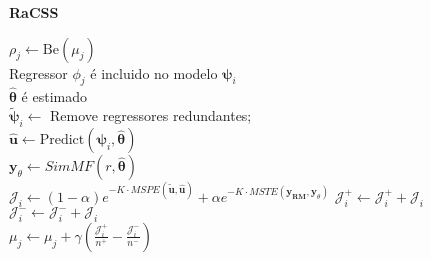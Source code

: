 \documentclass[12pt,a4paper,titlepage,final]{book}
\theoremstyle{definition}
\begin{document}
\begin{algorithm}[htpb]
  \caption{\bf{RaCSS}}\label{alg:RaMSS}
  {
     {
        {
           $\rho_j \gets \text{Be}(\mu_j)$ \\
           {
              Regressor $\phi_j$ é incluido no modelo $\bm{\psi}_i$\\
           }
        }
        $\hat{\bm{\theta}}$ é estimado \\
        $\tilde{\bm{\psi}}_i \gets $ Remove regressores redundantes; \\
        $\hat{\bm{u}} \gets \text{Predict}(\bm{\psi}_i,\hat{\bm{\theta}})$ \\
        $\bm{y}_{\theta} \gets SimMF(r,\hat{\bm{\theta}})$ \\
        $\mathcal{J}_i \gets (1-\alpha)e^{-K\cdot MSPE(\tilde{\bm{u}},\bm{\hat{u}})} + \alpha e^{-K\cdot MSTE(\bm{y_{RM}},\bm{y}_\theta)} $
     }
     {
        {
           {
              $\mathcal{J}_i^{+} \gets \mathcal{J}_i^{+} + \mathcal{J}_i$ \\
           } \Else
           {
              $\mathcal{J}_i^{-} \gets \mathcal{J}_i^{-} + \mathcal{J}_i$ \\
           }
        }
        $\mu_j \gets \mu_j + \gamma  \left( \frac{\mathcal{J}_i^{+}}{n^+} - \frac{\mathcal{J}_i^{-}}{n^-} \right) $ \\
     }
  }
\end{algorithm}%
\end{document}
